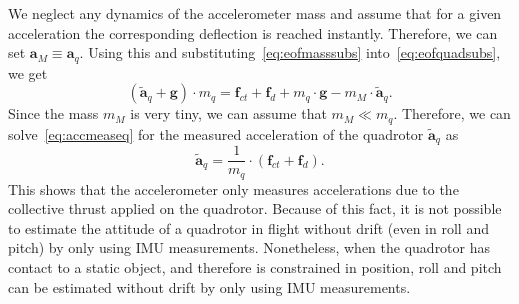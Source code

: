 \documentclass[10pt,a4paper,fleqn]{article}
\newcommand{\bVec}[1]{\mathbf{#1}}
\begin{document}
%
We neglect any dynamics of the accelerometer mass and assume that for a given acceleration the corresponding deflection is reached instantly. 
Therefore, we can set $\bVec{a}_M \equiv \bVec{a}_q$. Using this and substituting~\eqref{eq:eofmasssubs} into~\eqref{eq:eofquadsubs}, we get
%
\begin{equation}
	\left( \tilde{\bVec{a}}_q + \bVec{g} \right) \cdot m_q = \bVec{f}_{ct} + \bVec{f}_{d} + m_q\cdot \bVec{g} - m_M \cdot \tilde{\bVec{a}}_q .
	\label{eq:accmeaseq}
\end{equation}
%
Since the mass $m_M$ is very tiny, we can assume that $m_M \ll m_q$. 
Therefore, we can solve~\eqref{eq:accmeaseq} for the measured acceleration of the quadrotor $\tilde{\bVec{a}}_q$ as
%
\begin{equation}
	\tilde{\bVec{a}}_q = \frac{1}{m_q} \cdot \left( \bVec{f}_{ct} + \bVec{f}_{d} \right) .
\end{equation}
%
This shows that the accelerometer only measures accelerations due to the collective thrust applied on the quadrotor. 
Because of this fact, it is not possible to estimate the attitude of a quadrotor in flight without drift (even in roll and pitch) by only using IMU measurements. 
Nonetheless, when the quadrotor has contact to a static object, and therefore is constrained in position, roll and pitch can be estimated without drift by only using IMU measurements.

\newpage


\end{document}
